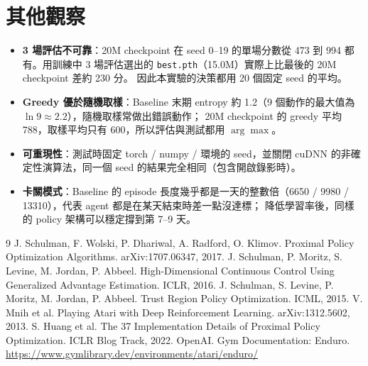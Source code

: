 \documentclass[11pt,a4paper]{article}
\begin{document}
\section{其他觀察}
\begin{itemize}[leftmargin=1.2em]
  \item \textbf{3 場評估不可靠}：20M checkpoint 在 seed 0--19 的單場分數從 473 到 994 都有。用訓練中 3 場評估選出的 \texttt{best.pth}（15.0M）實際上比最後的 20M checkpoint 差約 230 分。
        因此本實驗的決策都用 20 個固定 seed 的平均。
  \item \textbf{Greedy 優於隨機取樣}：Baseline 末期 entropy 約 1.2（9 個動作的最大值為 $\ln 9\approx2.2$），隨機取樣常做出錯誤動作；
        20M checkpoint 的 greedy 平均 788，取樣平均只有 600，所以評估與測試都用 $\arg\max$。
  \item \textbf{可重現性}：測試時固定 torch / numpy / 環境的 seed，並關閉 cuDNN 的非確定性演算法，同一個 seed 的結果完全相同（包含開啟錄影時）。
  \item \textbf{卡關模式}：Baseline 的 episode 長度幾乎都是一天的整數倍（6650 / 9980 / 13310），代表 agent 都是在某天結束時差一點沒達標；
        降低學習率後，同樣的 policy 架構可以穩定撐到第 7--9 天。
\end{itemize}

\begin{thebibliography}{9}
 J. Schulman, F. Wolski, P. Dhariwal, A. Radford, O. Klimov. Proximal Policy Optimization Algorithms. arXiv:1707.06347, 2017.
 J. Schulman, P. Moritz, S. Levine, M. Jordan, P. Abbeel. High-Dimensional Continuous Control Using Generalized Advantage Estimation. ICLR, 2016.
 J. Schulman, S. Levine, P. Moritz, M. Jordan, P. Abbeel. Trust Region Policy Optimization. ICML, 2015.
 V. Mnih et al. Playing Atari with Deep Reinforcement Learning. arXiv:1312.5602, 2013.
 S. Huang et al. The 37 Implementation Details of Proximal Policy Optimization. ICLR Blog Track, 2022.
 OpenAI. Gym Documentation: Enduro. \url{https://www.gymlibrary.dev/environments/atari/enduro/}
\end{thebibliography}
\end{document}
